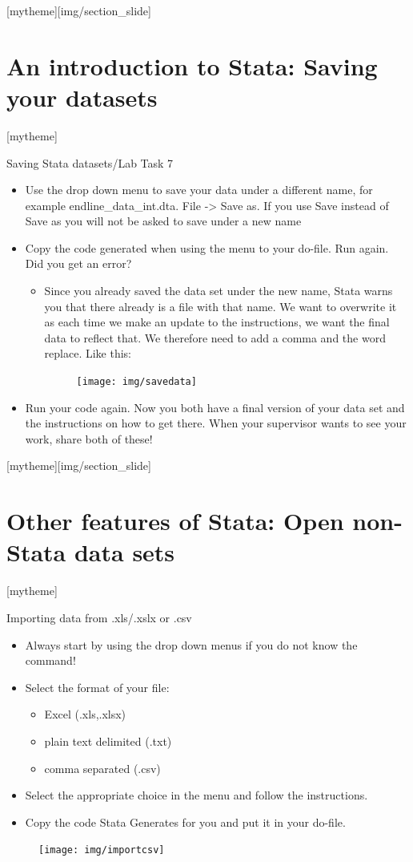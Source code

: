 \documentclass[aspectratio=169]{beamer}
\newcommand{\sectionpic}[2]{
	\setbeamertemplate{section page}[mytheme][#2]
	\section{#1}
	\setbeamertemplate{section page}[mytheme]
}
\begin{document}
\sectionpic{An introduction to Stata: \newline Saving your datasets}{img/section_slide}

\begin{frame}{Saving Stata datasets/Lab Task 7}
\begin{itemize}
	\item Use the drop down menu to save your data under a different name, for example endline\_data\_int.dta. File -> Save as. If you use Save instead of Save as you will not be asked to save under a new name
	\item Copy the code generated when using the menu to your do-file. Run again. Did you get an error?
		\begin{itemize}
			\item Since you already saved the data set under the new name, Stata warns you that there already is a file with that name. We want to overwrite it as each time we make an update to the instructions, we want the final data to reflect that. We therefore need to add a comma and the word replace. Like this:
				\begin{figure}
					\centering
					\texttt{[image: img/savedata]}
				\end{figure}
		\end{itemize}
	\item Run your code again. Now you both have a final version of your data set and the instructions on how to get there. When your supervisor wants to see your work, share both of these! 
\end{itemize}
\end{frame}


\sectionpic{Other features of Stata: \newline Open non-Stata data sets}{img/section_slide}

\begin{frame}[fragile]{Importing data from .xls/.xslx or .csv}

\begin{multicols}{2}	
	\begin{itemize}
		\item Always start by using the drop down menus if you do not know the command!
		\item Select the format of your file: 
				\begin{itemize}
					\item Excel (.xls,.xlsx)
					\item plain text delimited (.txt)
					\item comma separated (.csv)
				\end{itemize}		
		\item Select the appropriate choice in the menu and follow the instructions.
		\item Copy the code Stata Generates for you and put it in your do-file. 
	\end{itemize}
	\begin{figure}
		\centering
		\texttt{[image: img/importcsv]}
	\end{figure}
\end{multicols}
\end{frame}
\end{document}
